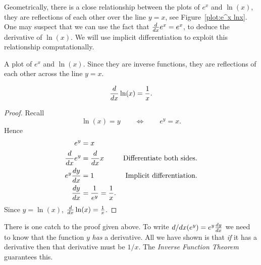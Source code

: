Geometrically, there is a close relationship between the plots of
$e^x$ and $\ln(x)$, they are reflections of each other over the line
$y=x$, see Figure~\ref{plot:e^x lnx}. One may suspect that we can use the fact
that $\frac{d}{dx} e^x = e^x$, to deduce the derivative of $\ln(x)$.  We will
use implicit differentiation to exploit this relationship
computationally.

\begin{marginfigure}
\caption{A plot of $e^x$ and $\ln(x)$. Since they are inverse
  functions, they are reflections of each other across the line $y=x$.}
\label{plot:e^x lnx}
\end{marginfigure}


\begin{mainTheorem}
\[
\frac{d}{dx} \ln(x) = \frac{1}{x}.
\]
\end{mainTheorem}

\begin{proof}
Recall
\[
\ln(x) = y \qquad\Leftrightarrow\qquad e^y = x.
\]
Hence
\begin{align*}
e^y &= x\\
\frac{d}{dx} e^y &= \frac{d}{dx} x &\text{Differentiate both sides.}\\
e^y \frac{dy}{dx} &= 1 &\text{Implicit differentiation.}\\
\frac{dy}{dx} &= \frac{1}{e^y} = \frac{1}{x}.
\end{align*}
Since $y=\ln(x)$, $\frac{d}{dx} \ln(x) = \frac{1}{x}$.
\end{proof}

There is one catch to the proof given above. To write
$d/dx(e^y)=e^y\frac{dy}{dx}$ we need to know that the function $y$
\textit{has} a derivative. All we have shown is that \textit{if} it
has a derivative then that derivative must be $1/x$. The \textit{Inverse
Function Theorem} guarantees this.

